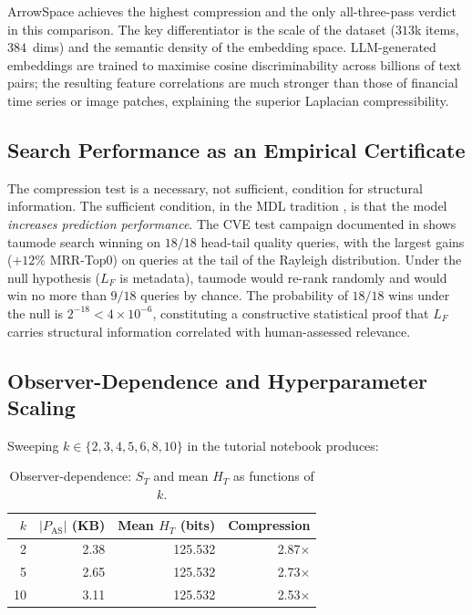 \documentclass[12pt,a4paper]{article}
\theoremstyle{plain}
\theoremstyle{definition}
\theoremstyle{remark}
\newcommand{\1}{\mathbf{1}}
\begin{document}
	ArrowSpace achieves the highest compression and the only all-three-pass
	verdict in this comparison.
	The key differentiator is the scale of the dataset ($313$k items,
	$384$~dims) and the semantic density of the embedding space.
	LLM-generated embeddings are trained to maximise cosine discriminability
	across billions of text pairs; the resulting feature correlations are
	much stronger than those of financial time series or image patches,
	explaining the superior Laplacian compressibility.
	
	\subsection{Search Performance as an Empirical Certificate}
	
	The compression test is a necessary, not sufficient, condition for
	structural information.
	The sufficient condition, in the MDL tradition
	\citep{VitanyiStructureFunction, VitanyiMDL}, is that the model
	\emph{increases prediction performance}.
	The CVE test campaign documented in \cite{graphwiring2025} shows
	taumode search winning on $18/18$ head-tail quality queries, with the
	largest gains ($+12\%$ MRR-Top0) on queries at the tail of the
	Rayleigh distribution.
	Under the null hypothesis ($L_F$ is metadata), taumode would re-rank
	randomly and would win no more than $9/18$ queries by chance.
	The probability of $18/18$ wins under the null is $2^{-18} < 4\times
	10^{-6}$, constituting a constructive statistical proof that $L_F$
	carries structural information correlated with human-assessed relevance.
	
	\subsection{Observer-Dependence and Hyperparameter Scaling}
	
	Sweeping $k\in\{2,3,4,5,6,8,10\}$ in the tutorial notebook produces:
	
	\begin{table}[H]
		\centering
		\caption{Observer-dependence: $S_T$ and mean $H_T$ as functions of $k$.}
		\label{tab:observer}
		\begin{tabular}{rrrr}
			\toprule
			$k$ & $|P_\mathrm{AS}|$ (KB) & Mean $H_T$ (bits) & Compression \\
			\midrule
			2  & 2.38 & 125.532 & 2.87$\times$ \\
			5  & 2.65 & 125.532 & 2.73$\times$ \\
			10 & 3.11 & 125.532 & 2.53$\times$ \\
			\bottomrule
		\end{tabular}
	\end{table}
	
\end{document}

